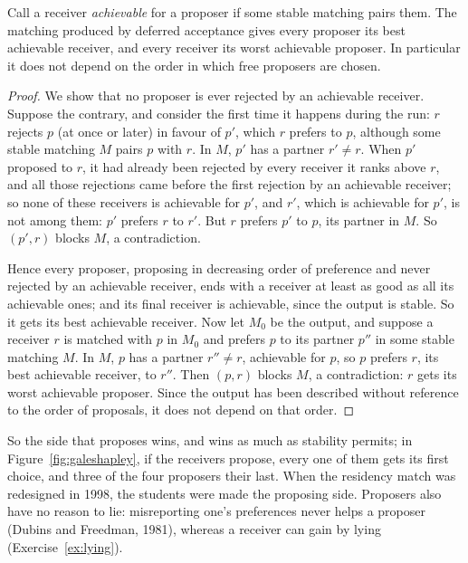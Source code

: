 \begin{theorem}\label{thm:proposeroptimal}
Call a receiver \emph{achievable} for a proposer if some stable matching pairs them. The matching produced by deferred acceptance
gives every proposer its best achievable receiver, and every receiver its worst achievable proposer. In particular it does
not depend on the order in which free proposers are chosen.
\end{theorem}
\begin{proof}
We show that no proposer is ever rejected by an achievable receiver. Suppose the contrary, and consider the first time it
happens during the run: $r$ rejects $p$ (at once or later) in favour of $p'$, which $r$ prefers to $p$, although some stable matching $M$ pairs $p$
with $r$. In $M$, $p'$ has a partner $r'\ne r$. When $p'$ proposed to $r$, it had already been rejected by every receiver it ranks above $r$, and
all those rejections came before the first rejection by an achievable receiver; so none of these receivers is achievable for $p'$,
and $r'$, which is achievable for $p'$, is not among them: $p'$ prefers $r$ to $r'$. But $r$ prefers $p'$ to $p$, its partner in $M$. So $(p',r)$ blocks $M$,
a contradiction.

Hence every proposer, proposing in decreasing order of preference and never rejected by an achievable receiver, ends with a
receiver at least as good as all its achievable ones; and its final receiver is achievable, since the output is stable. So it gets
its best achievable receiver. Now let $M_0$ be the output, and suppose a receiver $r$ is matched with $p$ in $M_0$ and prefers $p$ to its partner
$p''$ in some stable matching $M$. In $M$, $p$ has a partner $r''\ne r$, achievable for $p$, so $p$ prefers $r$, its best achievable receiver, to $r''$.
Then $(p,r)$ blocks $M$, a contradiction: $r$ gets its worst achievable proposer. Since the output has been described without
reference to the order of proposals, it does not depend on that order.
\end{proof}

So the side that proposes wins, and wins as much as stability permits; in Figure~\ref{fig:galeshapley}, if the receivers propose,
every one of them gets its first choice, and three of the four proposers their last. When the residency match was redesigned in
1998, the students were made the proposing side. Proposers also have no reason to lie: misreporting one's preferences never helps a
proposer (Dubins and Freedman, 1981), whereas a receiver can gain by lying (Exercise~\ref{ex:lying}).

